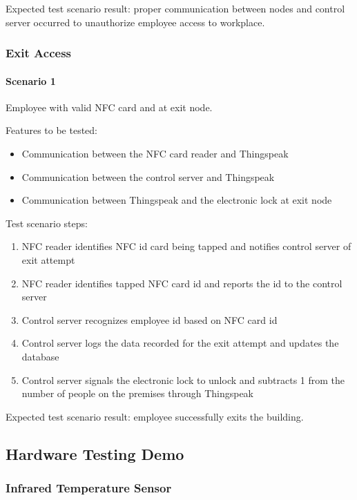 \noindent
Expected test scenario result: proper communication between nodes and control
server occurred to unauthorize employee access to workplace.

\subsubsection*{Exit Access}

\paragraph{Scenario 1}
Employee with valid NFC card and at exit node.

\noindent
Features to be tested:
\begin{itemize}
    \item Communication between the NFC card reader and Thingspeak
    \item Communication between the control server and Thingspeak
    \item Communication between Thingspeak and the electronic lock at exit node 
\end{itemize}

\noindent
Test scenario steps:
\begin{enumerate}
    \item NFC reader identifies NFC id card being tapped and notifies control
          server of exit attempt
    \item NFC reader identifies tapped NFC card id and reports the id to the
          control server
    \item Control server recognizes employee id based on NFC card id 
    \item Control server logs the data recorded for the exit attempt and updates
          the database 
    \item Control server signals the electronic lock to unlock and subtracts 1
          from the number of people on the premises through Thingspeak
\end{enumerate}

\noindent
Expected test scenario result: employee successfully exits the building.

\subsection{Hardware Testing Demo}

\subsubsection{Infrared Temperature Sensor}

